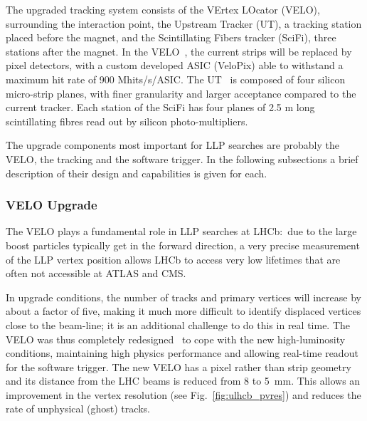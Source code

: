 The upgraded tracking system consists of the VErtex LOcator (VELO), surrounding the interaction point, the Upstream Tracker (UT), a tracking station placed before the magnet, and the Scintillating Fibers tracker (SciFi), three stations after the magnet. 
In the VELO~\cite{LHCb-TDR-013}, the current strips will be replaced by pixel detectors, with a custom developed ASIC (VeloPix) able to withstand a maximum hit rate of 900 Mhits/s/ASIC. The UT~\cite{LHCb-TDR-015} is composed of four silicon micro-strip planes, with finer granularity and larger acceptance compared to the current tracker. Each station of the SciFi has four planes of 2.5 m long scintillating fibres read out by silicon photo-multipliers.

The upgrade components most important for LLP searches are probably the  VELO, the tracking and the software trigger. In the following subsections a brief description of their design and capabilities is given for each.


\subsubsection{VELO Upgrade}
The VELO plays a fundamental role in LLP searches at LHCb:~due to the large boost particles typically get in the forward direction, a very precise measurement of the LLP vertex position allows LHCb to access very low lifetimes that are often not accessible at ATLAS and CMS.

In upgrade conditions, the number of tracks and primary vertices will increase by about a factor of five, making it much more difficult to identify displaced vertices close to the beam-line; it is an additional challenge to do this in real time.
The VELO was thus completely redesigned~\cite{LHCb-TDR-013} to cope with the new high-luminosity conditions, maintaining high physics performance and allowing real-time readout for the software trigger. The new VELO has a pixel rather than strip geometry and its distance from the LHC beams is reduced from 8 to 5~mm. This allows  an improvement in the vertex resolution (see Fig.~\ref{fig:ulhcb_pvres}) and reduces the rate of unphysical (ghost) tracks.

